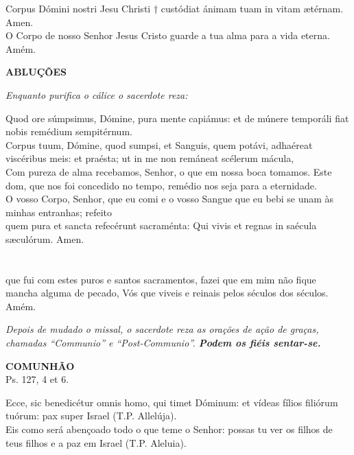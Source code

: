 \begin{multicols}{2}
	\noindent Corpus Dómini nostri Jesu Christi $\dag$ custódiat ánimam tuam in vitam ætérnam. Amen.
	\\O Corpo de nosso Senhor Jesus Cristo guarde a tua alma para a vida eterna. Amém.
\end{multicols}
\begin{center}
	\textbf{ABLUÇÕES}
\end{center}
\begin{flushleft}
	\textit{Enquanto purifica o cálice o sacerdote reza:}
\end{flushleft}
\begin{multicols}{2}
	\noindent Quod ore súmpsimus, Dómine, pura mente capiámus: et de múnere temporáli fiat nobis remédium sempitérnum. 
	\\ Corpus tuum, Dómine, quod sumpsi, et Sanguis, quem potávi, adhaéreat viscéribus meis: et praésta; ut in me non remáneat scélerum mácula,  
	\\ Com pureza de alma recebamos, Senhor, o que em nossa boca tomamos. Este dom, que nos foi concedido no tempo, remédio nos seja para a eternidade.
	\\ O vosso Corpo, Senhor, que eu comi e o vosso Sangue que eu bebi se unam às minhas entranhas; refeito
	\\quem pura et sancta refecérunt sacraménta: Qui vivis et regnas in saécula sæculórum. Amen.
	\\
	\\
	\\ que fui com estes puros e santos sacramentos, fazei que em mim não fique mancha alguma de pecado, Vós que viveis e reinais pelos séculos dos séculos. Amém.
\end{multicols}
\begin{flushleft}
	\textit{Depois de mudado o missal, o sacerdote reza as orações de ação de graças, chamadas “Communio” e “Post-Communio”. \textbf{Podem os fiéis sentar-se.}}
\end{flushleft}
\begin{center}
	\textbf{COMUNHÃO}
	\\Ps. 127, 4 et 6.
\end{center}
\begin{multicols}{2}
	\noindent Ecce, sic benedicétur omnis homo, qui timet Dóminum: et vídeas fílios filiórum tuórum: pax super Israel (T.P. Allelúja).
	\\ Eis como será abençoado todo o que teme o Senhor: possas tu ver os filhos de teus filhos e a paz em Israel (T.P. Aleluia).
\end{multicols}
